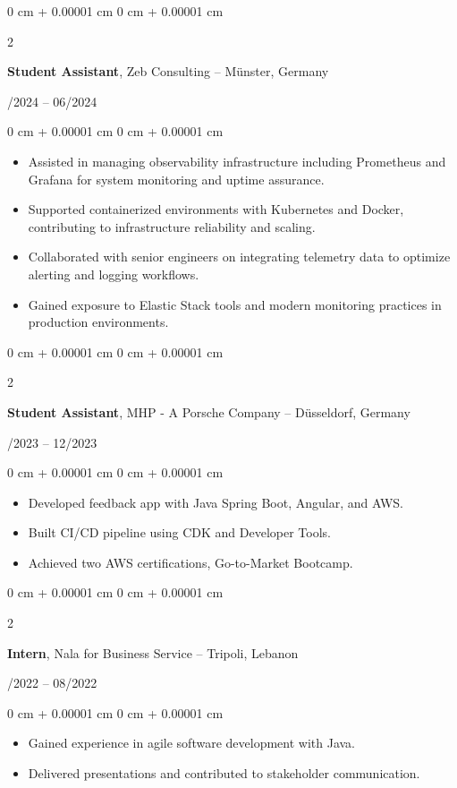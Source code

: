 \documentclass[10pt, letterpaper]{article}
\newenvironment{highlights}{
    \begin{itemize}[
        topsep=0.10 cm,
        parsep=0.10 cm,
        partopsep=0pt,
        itemsep=0pt,
        leftmargin=0 cm + 10pt
    ]
}{
    \end{itemize}
} %
\newenvironment{onecolentry}{
    \begin{adjustwidth}{
        0 cm + 0.00001 cm
    }{
        0 cm + 0.00001 cm
    }
}{
    \end{adjustwidth}
} %
\newenvironment{twocolentry}[2][]{
    \onecolentry
    \def\secondColumn{#2}
    \setcolumnwidth{\fill, 4.5 cm}
    \begin{paracol}{2}
}{
    \switchcolumn \raggedleft \secondColumn
    \end{paracol}
    \endonecolentry
} %
\begin{document}
\vspace{0.2cm}

\begin{twocolentry}{01/2024 -- 06/2024}
\textbf{Student Assistant}, Zeb Consulting -- Münster, Germany
\end{twocolentry}
\begin{onecolentry}
\begin{highlights}
\item Assisted in managing observability infrastructure including Prometheus and Grafana for system monitoring and uptime assurance.
\item Supported containerized environments with Kubernetes and Docker, contributing to infrastructure reliability and scaling.
\item Collaborated with senior engineers on integrating telemetry data to optimize alerting and logging workflows.
\item Gained exposure to Elastic Stack tools and modern monitoring practices in production environments.
\end{highlights}
\end{onecolentry}

\vspace{0.2cm}

\begin{twocolentry}{03/2023 -- 12/2023}
\textbf{Student Assistant}, MHP - A Porsche Company -- Düsseldorf, Germany
\end{twocolentry}
\begin{onecolentry}
\begin{highlights}
\item Developed feedback app with Java Spring Boot, Angular, and AWS.
\item Built CI/CD pipeline using CDK and Developer Tools.
\item Achieved two AWS certifications, Go-to-Market Bootcamp.
\end{highlights}
\end{onecolentry}

\vspace{0.2cm}

\begin{twocolentry}{05/2022 -- 08/2022}
\textbf{Intern}, Nala for Business Service -- Tripoli, Lebanon
\end{twocolentry}
\begin{onecolentry}
\begin{highlights}
\item Gained experience in agile software development with Java.
\item Delivered presentations and contributed to stakeholder communication.
\end{highlights}
\end{onecolentry}
\end{document}
